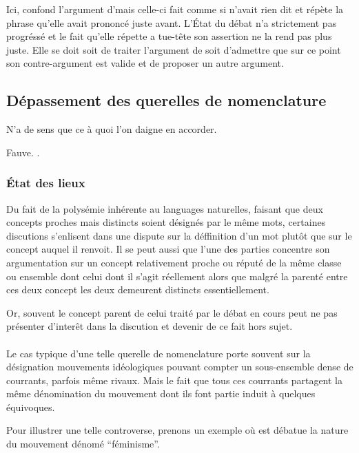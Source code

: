 Ici, \B confond l’argument d’\A mais celle-ci fait comme si \B n’avait rien dit et répète la phrase qu’elle avait prononcé juste avant. L’État du débat n’a strictement pas progréssé et le fait qu’elle répette a tue-tête son assertion ne la rend pas plus juste. Elle se doit soit de traiter l’argument de \B soit d’admettre que sur ce point son contre-argument est valide et de proposer un autre argument.

\subsection{Dépassement des querelles de nomenclature}
\epigraph{N’a de sens que ce à quoi l’on daigne en accorder.}{Fauve. .}
\subsubsection{État des lieux}
Du fait de la polysémie inhérente au languages naturelles, faisant que deux concepts proches mais distincts soient désignés par le même mots, certaines discutions s’enlisent dans une dispute sur la déffinition d’un mot plutôt que sur le concept auquel il renvoit. Il se peut aussi que l’une des parties concentre son argumentation sur un concept relativement proche ou réputé de la même classe ou ensemble dont celui dont il s’agit réellement alors que malgré la parenté entre ces deux concept les deux demeurent distincts essentiellement.

Or, souvent le concept parent de celui traité par le débat en cours peut ne pas présenter d’interêt dans la discution et devenir de ce fait hors sujet.

\paragraph{}
Le cas typique d’une telle querelle de nomenclature porte souvent sur la désignation mouvements idéologiques pouvant compter un sous-ensemble dense de courrants, parfois même rivaux. Mais le fait que tous ces courrants partagent la même dénomination du mouvement dont ils font partie induit à quelques équivoques.

Pour illustrer une telle controverse, prenons un exemple où est débatue la nature du mouvement dénomé \enquote{féminisme}.



